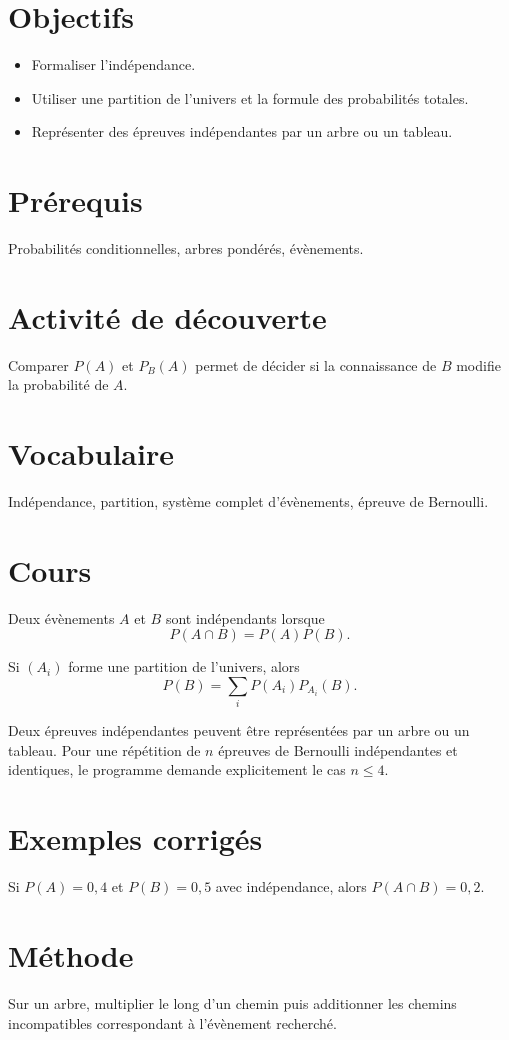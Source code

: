 \section{Objectifs}
\begin{itemize}
\item Formaliser l’indépendance.
\item Utiliser une partition de l’univers et la formule des probabilités totales.
\item Représenter des épreuves indépendantes par un arbre ou un tableau.
\end{itemize}

\section{Prérequis}
Probabilités conditionnelles, arbres pondérés, évènements.

\section{Activité de découverte}
Comparer $P(A)$ et $P_B(A)$ permet de décider si la connaissance de $B$ modifie la probabilité de $A$.

\section{Vocabulaire}
Indépendance, partition, système complet d’évènements, épreuve de Bernoulli.

\section{Cours}
Deux évènements $A$ et $B$ sont indépendants lorsque
\[
P(A\cap B)=P(A)P(B).
\]

Si $(A_i)$ forme une partition de l’univers, alors
\[
P(B)=\sum_i P(A_i)P_{A_i}(B).
\]

Deux épreuves indépendantes peuvent être représentées par un arbre ou un tableau. Pour une répétition de $n$ épreuves de Bernoulli indépendantes et identiques, le programme demande explicitement le cas $n\le 4$.

\section{Exemples corrigés}
Si $P(A)=0,4$ et $P(B)=0,5$ avec indépendance, alors $P(A\cap B)=0,2$.

\section{Méthode}
Sur un arbre, multiplier le long d’un chemin puis additionner les chemins incompatibles correspondant à l’évènement recherché.

